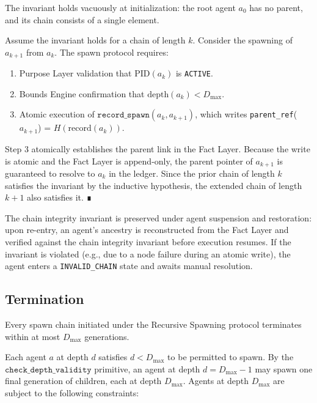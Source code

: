 \begin{Proof}
The invariant holds vacuously at initialization: the root agent $a_0$
has no parent, and its chain consists of a single element.

Assume the invariant holds for a chain of length $k$. Consider the
spawning of $a_{k+1}$ from $a_k$. The spawn protocol requires:

\begin{enumerate}
  \item Purpose Layer validation that $\text{PID}(a_k)$ is \texttt{ACTIVE}.
  \item Bounds Engine confirmation that $\text{depth}(a_k) < D_{\max}$.
  \item Atomic execution of $\texttt{record\_spawn}(a_k, a_{k+1})$,
        which writes \texttt{parent\_ref}($a_{k+1}$) = $H(\text{record}(a_k))$.
\end{enumerate}

Step 3 atomically establishes the parent link in the Fact Layer.
Because the write is atomic and the Fact Layer is append-only, the
parent pointer of $a_{k+1}$ is guaranteed to resolve to $a_k$ in the
ledger. Since the prior chain of length $k$ satisfies the invariant by
the inductive hypothesis, the extended chain of length $k+1$ also
satisfies it. ∎

The chain integrity invariant is preserved under agent suspension and
restoration: upon re-entry, an agent's ancestry is reconstructed from
the Fact Layer and verified against the chain integrity invariant before
execution resumes. If the invariant is violated (e.g., due to a node
failure during an atomic write), the agent enters a \texttt{INVALID\_CHAIN}
state and awaits manual resolution.

\subsection{Termination}
\label{sec:termination}

\begin{Theorem}
Every spawn chain initiated under the Recursive Spawning protocol
terminates within at most $D_{\max}$ generations.
\end{Theorem}

\begin{Proof}
Each agent $a$ at depth $d$ satisfies $d < D_{\max}$ to be permitted
to spawn. By the $\texttt{check\_depth\_validity}$ primitive, an agent
at depth $d = D_{\max} - 1$ may spawn one final generation of children,
each at depth $D_{\max}$. Agents at depth $D_{\max}$ are subject to the
following constraints:


\end{Proof}
\end{Proof}
